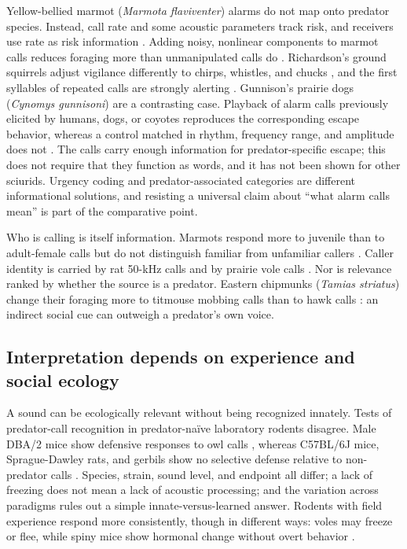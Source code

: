 Yellow-bellied marmot (\textit{Marmota flaviventer}) alarms do not map onto predator species. Instead, call rate and some acoustic parameters track risk, and receivers use rate as risk information \citep{BlumsteinArmitage1997}.
Adding noisy, nonlinear components to marmot calls reduces foraging more than unmanipulated calls do \citep{BlumsteinRecapet2009}. Richardson's ground squirrels adjust vigilance differently to chirps, whistles, and chucks \citep{SloanEtAl2005}, and the first syllables of repeated calls are strongly alerting \citep{SwanHare2008}. Gunnison's prairie dogs (\textit{Cynomys gunnisoni}) are a contrasting case. Playback of alarm calls previously elicited by humans, dogs, or coyotes reproduces the corresponding escape behavior, whereas a control matched in rhythm, frequency range, and amplitude does not \citep{KiriazisSlobodchikoff2006}. The calls carry enough information for predator-specific escape; this does not require that they function as words, and it has not been shown for other sciurids. Urgency coding and predator-associated categories are different informational solutions, and resisting a universal claim about ``what alarm calls mean'' is part of the comparative point.

Who is calling is itself information. Marmots respond more to juvenile than to adult-female calls but do not distinguish familiar from unfamiliar callers \citep{BlumsteinDaniel2004}. Caller identity is carried by rat 50-kHz calls \citep{VielleEtAl2021} and by prairie vole calls \citep{WarrenEtAl2025}.
Nor is relevance ranked by whether the source is a predator. Eastern chipmunks (\textit{Tamias striatus}) change their foraging more to titmouse mobbing calls than to hawk calls \citep{SchmidtEtAl2008}: an indirect social cue can outweigh a predator's own voice.

\subsection{Interpretation depends on experience and social ecology}
\label{sec:features-experience}

A sound can be ecologically relevant without being recognized innately. Tests of predator-call recognition in predator-naïve laboratory rodents disagree. Male DBA/2 mice show defensive responses to owl calls \citep{HendrieNeill1991}, whereas C57BL/6J mice, Sprague-Dawley rats, and gerbils show no selective defense relative to non-predator calls \citep{KindermannEtAl2009}. Species, strain, sound level, and endpoint all differ; a lack of freezing does not mean a lack of acoustic processing; and the variation across paradigms rules out a simple innate-versus-learned answer. Rodents with field experience respond more consistently, though in different ways: voles may freeze or flee, while spiny mice show hormonal change without overt behavior \citep{EilamEtAl1999,HendrieEtAl1998}.

